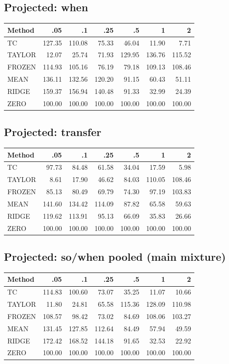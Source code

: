 \subsection{Projected: when}
\begin{center}\small\begin{tabular}{lrrrrrr}
\toprule Method & .05 & .1 & .25 & .5 & 1 & 2\\
\midrule
TC & 127.35 & 110.08 & 75.33 & 46.04 & 11.90 & 7.71\\
TAYLOR & 12.07 & 25.74 & 71.93 & 129.95 & 136.76 & 115.52\\
FROZEN & 114.93 & 105.16 & 76.19 & 79.18 & 109.13 & 108.46\\
MEAN & 136.11 & 132.56 & 120.20 & 91.15 & 60.43 & 51.11\\
RIDGE & 159.37 & 156.94 & 140.48 & 91.33 & 32.99 & 24.39\\
ZERO & 100.00 & 100.00 & 100.00 & 100.00 & 100.00 & 100.00\\
\bottomrule\end{tabular}\end{center}
\subsection{Projected: transfer}
\begin{center}\small\begin{tabular}{lrrrrrr}
\toprule Method & .05 & .1 & .25 & .5 & 1 & 2\\
\midrule
TC & 97.73 & 84.48 & 61.58 & 34.04 & 17.59 & 5.98\\
TAYLOR & 8.61 & 17.90 & 46.62 & 84.03 & 110.05 & 108.46\\
FROZEN & 85.13 & 80.49 & 69.79 & 74.30 & 97.19 & 103.83\\
MEAN & 141.60 & 134.42 & 114.09 & 87.82 & 65.58 & 59.63\\
RIDGE & 119.62 & 113.91 & 95.13 & 66.09 & 35.83 & 26.66\\
ZERO & 100.00 & 100.00 & 100.00 & 100.00 & 100.00 & 100.00\\
\bottomrule\end{tabular}\end{center}
\subsection{Projected: so/when pooled (main mixture)}
\begin{center}\small\begin{tabular}{lrrrrrr}
\toprule Method & .05 & .1 & .25 & .5 & 1 & 2\\
\midrule
TC & 114.83 & 100.60 & 73.07 & 35.25 & 11.07 & 10.66\\
TAYLOR & 11.80 & 24.81 & 65.58 & 115.36 & 128.09 & 110.98\\
FROZEN & 108.57 & 98.42 & 73.02 & 84.69 & 108.06 & 103.27\\
MEAN & 131.45 & 127.85 & 112.64 & 84.49 & 57.94 & 49.59\\
RIDGE & 172.42 & 168.52 & 144.18 & 91.65 & 32.53 & 22.92\\
ZERO & 100.00 & 100.00 & 100.00 & 100.00 & 100.00 & 100.00\\
\bottomrule\end{tabular}\end{center}
